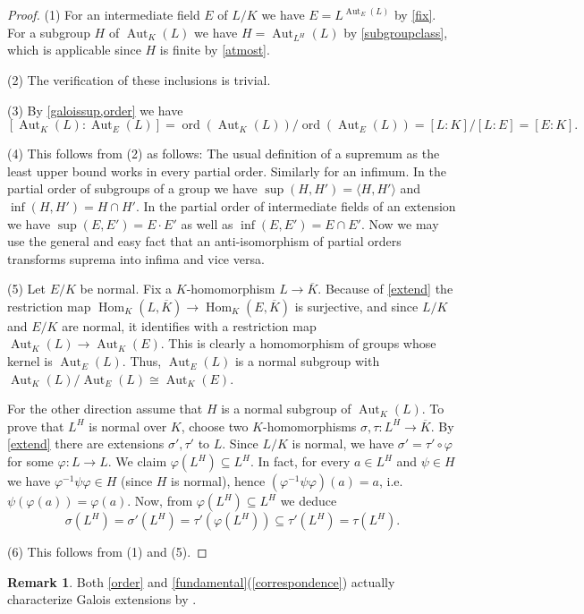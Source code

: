 \documentclass[11pt,reqno]{amsart}
\theoremstyle{standard}
\theoremstyle{definition}
\newtheorem{rem}[lemma]{Remark}
\DeclareMathOperator{\Hom}{Hom}
\DeclareMathOperator{\Aut}{Aut}
\DeclareMathOperator{\ord}{ord}
\newcommand{\alg}[1]{\overline{#1}}
\begin{document}
\begin{proof}
(1) For an intermediate field $E$ of $L/K$ we have $E = L^{\Aut_E(L)}$ by \cref{fix}. For a subgroup $H$ of $\Aut_K(L)$ we have $H = \Aut_{L^H}(L)$ by \cref{subgroupclass}, which is applicable since $H$ is finite by \cref{atmost}.

(2) The verification of these inclusions is trivial.

(3) By \cref{galoissup,order} we have
\[[\Aut_K(L):\Aut_E(L)] = \ord(\Aut_K(L)) / \ord(\Aut_E(L)) = [L:K] / [L:E] = [E:K].\]

(4) This follows from (2) as follows: The usual definition of a supremum as the least upper bound works in every partial order. Similarly for an infimum.
In the partial order of subgroups of a group we have $\sup(H,H') = \langle H,H' \rangle$ and $\inf(H,H') = H \cap H'$.
In the partial order of intermediate fields of an extension we have $\sup(E,E') = E \cdot E'$ as well as $\inf(E,E') = E \cap E'$.
Now we may use the general and easy fact that an anti-isomorphism of partial orders transforms suprema into infima and vice versa.

(5) Let $E/K$ be normal. Fix a $K$-homomorphism $L \to \alg{K}$. Because of \cref{extend} the restriction map $\Hom_K(L,\alg{K}) \to \Hom_K(E,\alg{K})$ is surjective, and since $L/K$ and $E/K$ are normal, it identifies with a restriction map $\Aut_K(L) \to \Aut_K(E)$. This is clearly a homomorphism of groups whose kernel is $\Aut_E(L)$. Thus, $\Aut_E(L)$ is a normal subgroup with $\Aut_K(L) / \Aut_E(L) \cong \Aut_K(E)$.

For the other direction assume that $H$ is a normal subgroup of $\Aut_K(L)$. To prove that $L^H$ is normal over $K$, choose two $K$-homomorphisms $\sigma,\tau : L^H \to \alg{K}$. By \cref{extend} there are extensions $\sigma',\tau'$ to $L$. Since $L/K$ is normal, we have $\sigma' = \tau' \circ \varphi$ for some $\varphi : L \to L$. We claim $\varphi(L^H) \subseteq L^H$. In fact, for every $a \in L^H$ and $\psi \in H$ we have $\varphi^{-1} \psi \varphi \in H$ (since $H$ is normal), hence $(\varphi^{-1} \psi \varphi)(a)=a$, i.e.\ $\psi(\varphi(a)) = \varphi(a)$. Now, from $\varphi(L^H) \subseteq L^H$ we deduce
\[\sigma(L^H) = \sigma'(L^H) = \tau'(\varphi(L^H)) \subseteq \tau'(L^H) = \tau(L^H).\]

(6) This follows from (1) and (5).
\end{proof}

\begin{rem}
Both \cref{order} and \cref{fundamental}(\ref{correspondence}) actually characterize Galois extensions by \cite[Thm.\ VII.6.9]{Aluffi}.
\end{rem}
\end{document}
